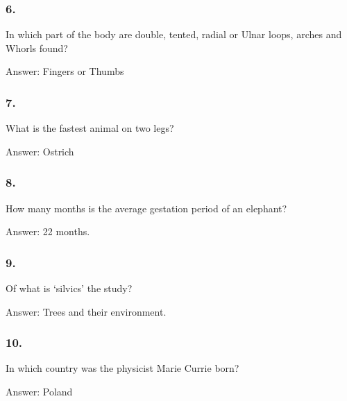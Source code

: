 \documentclass{beamer}
\begin{document}
    \begin{frame}
        \frametitle{6.}
        In which part of the body are double, tented, radial or Ulnar loops,
        arches and Whorls found?\\

        \begin{center}
            Answer: Fingers or Thumbs
        \end{center}
    \end{frame}

    \begin{frame}
        \frametitle{7.}
        What is the fastest animal on two legs?\\

        \begin{center}
            Answer: Ostrich
        \end{center}
    \end{frame}

    \begin{frame}
        \frametitle{8.}
        How many months is the average gestation period of an elephant?\\

        \begin{center}
            Answer: 22 months.
        \end{center}
    \end{frame}

    \begin{frame}
        \frametitle{9.}
        Of what is `silvics' the study?\\

        \begin{center}
            Answer: Trees and their environment.
        \end{center}
    \end{frame}

    \begin{frame}
        \frametitle{10.}
        In which country was the physicist Marie Currie born?\\

        \begin{center}
            Answer: Poland
        \end{center}
    \end{frame}
\end{document}
